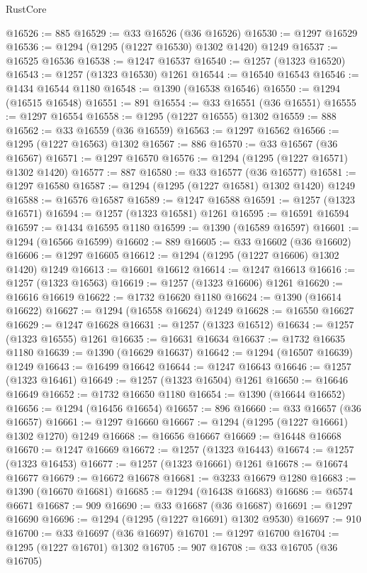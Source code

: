 \begin{lexlean}{RustCore}
\begin{coremodule}
@16526 := 885
@16529 := @33 @16526 (@36 @16526)
@16530 := @1297 @16529
@16536 := @1294 (@1295 (@1227 @16530) @1302 @1420) @1249
@16537 := @16525 @16536
@16538 := @1247 @16537
@16540 := @1257 (@1323 @16520)
@16543 := @1257 (@1323 @16530) @1261
@16544 := @16540 @16543
@16546 := @1434 @16544 @1180
@16548 := @1390 (@16538 @16546)
@16550 := @1294 (@16515 @16548)
@16551 := 891
@16554 := @33 @16551 (@36 @16551)
@16555 := @1297 @16554
@16558 := @1295 (@1227 @16555) @1302
@16559 := 888
@16562 := @33 @16559 (@36 @16559)
@16563 := @1297 @16562
@16566 := @1295 (@1227 @16563) @1302
@16567 := 886
@16570 := @33 @16567 (@36 @16567)
@16571 := @1297 @16570
@16576 := @1294 (@1295 (@1227 @16571) @1302 @1420)
@16577 := 887
@16580 := @33 @16577 (@36 @16577)
@16581 := @1297 @16580
@16587 := @1294 (@1295 (@1227 @16581) @1302 @1420) @1249
@16588 := @16576 @16587
@16589 := @1247 @16588
@16591 := @1257 (@1323 @16571)
@16594 := @1257 (@1323 @16581) @1261
@16595 := @16591 @16594
@16597 := @1434 @16595 @1180
@16599 := @1390 (@16589 @16597)
@16601 := @1294 (@16566 @16599)
@16602 := 889
@16605 := @33 @16602 (@36 @16602)
@16606 := @1297 @16605
@16612 := @1294 (@1295 (@1227 @16606) @1302 @1420) @1249
@16613 := @16601 @16612
@16614 := @1247 @16613
@16616 := @1257 (@1323 @16563)
@16619 := @1257 (@1323 @16606) @1261
@16620 := @16616 @16619
@16622 := @1732 @16620 @1180
@16624 := @1390 (@16614 @16622)
@16627 := @1294 (@16558 @16624) @1249
@16628 := @16550 @16627
@16629 := @1247 @16628
@16631 := @1257 (@1323 @16512)
@16634 := @1257 (@1323 @16555) @1261
@16635 := @16631 @16634
@16637 := @1732 @16635 @1180
@16639 := @1390 (@16629 @16637)
@16642 := @1294 (@16507 @16639) @1249
@16643 := @16499 @16642
@16644 := @1247 @16643
@16646 := @1257 (@1323 @16461)
@16649 := @1257 (@1323 @16504) @1261
@16650 := @16646 @16649
@16652 := @1732 @16650 @1180
@16654 := @1390 (@16644 @16652)
@16656 := @1294 (@16456 @16654)
@16657 := 896
@16660 := @33 @16657 (@36 @16657)
@16661 := @1297 @16660
@16667 := @1294 (@1295 (@1227 @16661) @1302 @1270) @1249
@16668 := @16656 @16667
@16669 := @16448 @16668
@16670 := @1247 @16669
@16672 := @1257 (@1323 @16443)
@16674 := @1257 (@1323 @16453)
@16677 := @1257 (@1323 @16661) @1261
@16678 := @16674 @16677
@16679 := @16672 @16678
@16681 := @3233 @16679 @1280
@16683 := @1390 (@16670 @16681)
@16685 := @1294 (@16438 @16683)
@16686 := @6574 @6671
@16687 := 909
@16690 := @33 @16687 (@36 @16687)
@16691 := @1297 @16690
@16696 := @1294 (@1295 (@1227 @16691) @1302 @9530)
@16697 := 910
@16700 := @33 @16697 (@36 @16697)
@16701 := @1297 @16700
@16704 := @1295 (@1227 @16701) @1302
@16705 := 907
@16708 := @33 @16705 (@36 @16705)

\end{coremodule}
\end{lexlean}
